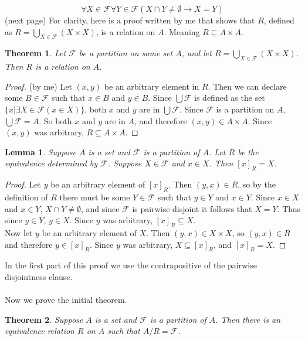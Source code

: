 \documentclass{report}
\newtheorem*{theorem}{Theorem}
\newtheorem*{lemma}{Lemma}
\theoremstyle{definition}
\begin{document}
\begin{equation*}
\forall X\in\mathcal F\forall Y\in\mathcal F(X\cap Y\neq\emptyset\to X=Y)
\end{equation*}
(next page)\newpage
\noindent For clarity, here is a proof written by me that shows that $R$, defined as $R=\bigcup_{X\in\mathcal F}(X\times X)$, is a relation on $A$. Meaning $R\subseteq A\times A$.
\begin{theorem}
Let $\mathcal F$ be a partition on some set $A$, and let $R=\bigcup_{X\in\mathcal F}(X\times X)$. Then $R$ is a relation on $A$.
\end{theorem}
\begin{proof} (by me)
Let $(x,y)$ be an arbitrary element in $R$. Then we can declare some $B\in\mathcal F$ such that $x\in B$ and $y\in B$. Since $\bigcup\mathcal F$ is defined as the set 
$\{x|\exists X\in\mathcal F(x\in X)\}$, both $x$ and $y$ are in $\bigcup\mathcal F$. Since $\mathcal F$ is a partition on $A$, $\bigcup\mathcal F=A$. So both $x$ and $y$ are in $A$, and therefore
$(x,y)\in A\times A$. Since $(x,y)$ was arbitrary, $R\subseteq A\times A$.
\end{proof}
\begin{lemma}
Suppose $A$ is a set and $\mathcal F$ is a partition of $A$. Let $R$ be the equivalence determined by $\mathcal F$. Suppose $X\in\mathcal F$ and $x\in X$. Then $[x]_R=X$.
\end{lemma}
\begin{proof}
Let $y$ be an arbitrary element of $[x]_R$. Then $(y,x)\in R$, so by the definition of $R$ there must be some $Y\in\mathcal F$ such that $y\in Y$ and $x\in Y$. Since $x\in X$ and $x\in Y$, 
$X\cap Y\neq\emptyset$, and since $\mathcal F$ is pairwise disjoint it follows that
$X=Y$. Thus since $y\in Y$, $y\in X$. Since $y$ was arbitrary, $[x]_R\subseteq X$.\\
\indent Now let $y$ be an arbitrary element of $X$. Then $(y,x)\in X\times X$, so $(y,x)\in R$ and
therefore $y\in[x]_R$. Since $y$ was arbitrary, $X\subseteq[x]_R$, and $[x]_R=X$.
\end{proof}
\noindent In the first part of this proof we use the contrapositive of the pairwise disjointness clause.\\
\vspace{1mm}\\
Now we prove the initial theorem.
\begin{theorem}
Suppose $A$ is a set and $\mathcal F$ is a partition of $A$. Then there is an equivalence relation $R$ on $A$ such that $A/R=\mathcal F$.
\end{theorem}
\end{document}
